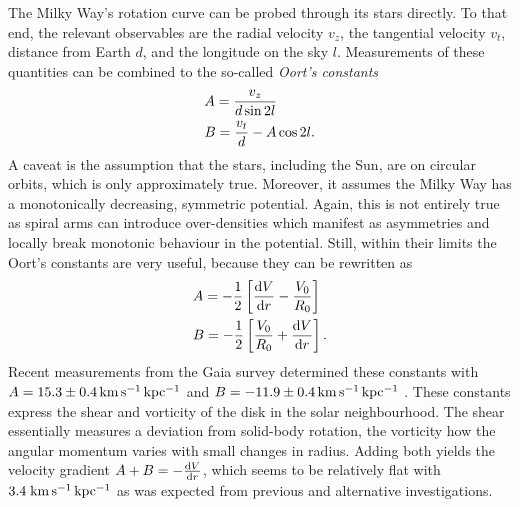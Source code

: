 The Milky Way's rotation curve can be probed through its stars directly. To that
end, the relevant observables are the radial velocity $v_{z}$, the tangential
velocity $v_{t}$, distance from Earth $d$, and the longitude on the sky $l$.
Measurements of these quantities can be combined to the so-called \textit{Oort's
constants}
%
\begin{equation}\eqlbl{obs_oortsC}%
    \begin{aligned}%
        &A = \frac{v_{z}}{d\sin{2l}} \\
        &B = \frac{v_{t}}{d} - A\cos{2l}.
    \end{aligned}%
\end{equation}%
%
A caveat is the assumption that the stars, including the Sun, are on circular
orbits, which is only approximately true.  Moreover, it assumes the Milky Way
has a monotonically decreasing, symmetric potential.  Again, this is not
entirely true as spiral arms can introduce over-densities which manifest as
asymmetries and locally break monotonic behaviour in the potential.  Still,
within their limits the Oort's constants are very useful, because they can be
rewritten as
%
\begin{equation}\eqlbl{oortsC}
    \begin{aligned}%
        &A = -\frac{1}{2} \left[\frac{\derivd V}{\derivd r}
                                - \frac{V_{0}}{R_{0}}\right] \\
        &B = -\frac{1}{2}\left[\frac{V_{0}}{R_{0}}
                               + \frac{\derivd V}{\derivd r}\right].
    \end{aligned}%
\end{equation}
%
Recent measurements from the Gaia survey determined these constants with
$A=15.3\pm0.4\,\mathrm{km\,s^{-1}\,kpc^{-1}}$ and $B=-11.9\pm0.4\,\mathrm{km\,s^{-1}\,kpc^{-1}}$
.  These constants express the shear and vorticity of the disk
in the solar neighbourhood.  The shear essentially measures a deviation from
solid-body rotation, the vorticity how the angular momentum varies with small
changes in radius.  Adding both yields the velocity gradient $A+B =
-\frac{\mathrm{d} V}{\mathrm{d} r}$, which seems to be relatively flat with
$3.4\;\mathrm{km\,s^{-1}\,kpc^{-1}}$ as was expected from previous and alternative
investigations.  

